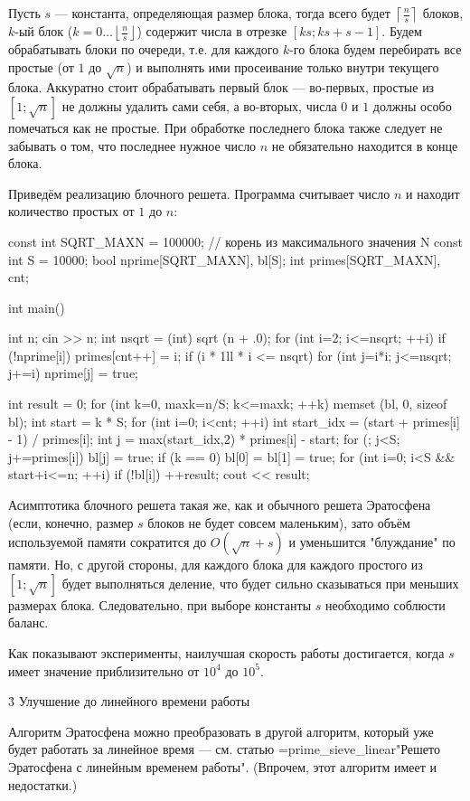 Пусть $s$ --- константа, определяющая размер блока, тогда всего будет $\left\lceil \frac{n}{s} \right\rceil$ блоков, $k$-ый блок ($k = 0 \ldots \left\lfloor \frac{n}{s} \right\rfloor$) содержит числа в отрезке $[ks; ks+s-1]$. Будем обрабатывать блоки по очереди, т.е. для каждого $k$-го блока будем перебирать все простые (от $1$ до $\sqrt{n}$) и выполнять ими просеивание только внутри текущего блока. Аккуратно стоит обрабатывать первый блок --- во-первых, простые из $[1; \sqrt{n}]$ не должны удалить сами себя, а во-вторых, числа $0$ и $1$ должны особо помечаться как не простые. При обработке последнего блока также следует не забывать о том, что последнее нужное число $n$ не обязательно находится в конце блока.

Приведём реализацию блочного решета. Программа считывает число $n$ и находит количество простых от $1$ до $n$:

\code
const int SQRT_MAXN = 100000; // корень из максимального значения N
const int S = 10000;
bool nprime[SQRT_MAXN], bl[S];
int primes[SQRT_MAXN], cnt;

int main() {

	int n;
	cin >> n;
	int nsqrt = (int) sqrt (n + .0);
	for (int i=2; i<=nsqrt; ++i)
		if (!nprime[i]) {
			primes[cnt++] = i;
			if (i * 1ll * i <= nsqrt)
				for (int j=i*i; j<=nsqrt; j+=i)
					nprime[j] = true;
		}

	int result = 0;
	for (int k=0, maxk=n/S; k<=maxk; ++k) {
		memset (bl, 0, sizeof bl);
		int start = k * S;
		for (int i=0; i<cnt; ++i) {
			int start_idx = (start + primes[i] - 1) / primes[i];
			int j = max(start_idx,2) * primes[i] - start;
			for (; j<S; j+=primes[i])
				bl[j] = true;
		}
		if (k == 0)
			bl[0] = bl[1] = true;
		for (int i=0; i<S && start+i<=n; ++i)
			if (!bl[i])
				++result;
	}
	cout << result;

}
\endcode

Асимптотика блочного решета такая же, как и обычного решета Эратосфена (если, конечно, размер $s$ блоков не будет совсем маленьким), зато объём используемой памяти сократится до $O(\sqrt{n} + s)$ и уменьшится "блуждание" по памяти. Но, с другой стороны, для каждого блока для каждого простого из $[1; \sqrt{n}]$ будет выполняться деление, что будет сильно сказываться при меньших размерах блока. Следовательно, при выборе константы $s$ необходимо соблюсти баланс.

Как показывают эксперименты, наилучшая скорость работы достигается, когда $s$ имеет значение приблизительно от $10^4$ до $10^5$.


\h3{ Улучшение до линейного времени работы }

Алгоритм Эратосфена можно преобразовать в другой алгоритм, который уже будет работать за линейное время --- см. статью \algohref=prime_sieve_linear{"Решето Эратосфена с линейным временем работы"}. (Впрочем, этот алгоритм имеет и недостатки.)